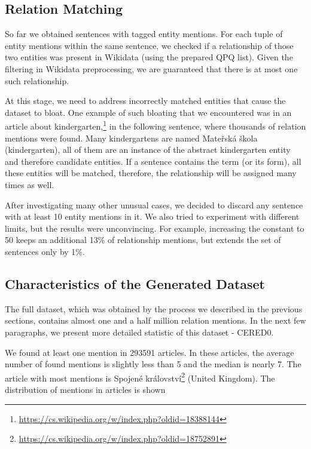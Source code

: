 \subsection{Relation Matching}
So far we obtained sentences with tagged entity mentions. For each tuple of entity mentions within the same sentence, we checked if a relationship of those two entities was present in Wikidata (using the prepared QPQ list). Given the filtering in Wikidata preprocessing, we are guaranteed that there is at most one such relationship. 

At this stage, we need to address incorrectly matched entities that cause the dataset to bloat. One example of such bloating that we encountered was in an article about kindergarten,\footnote{\url{https://cs.wikipedia.org/w/index.php?oldid=18388144}} in the following sentence, where thousands of relation mentions were found.   Many kindergartens are named Mateřská škola (kindergarten), all of them are an instance of the abstract kindergarten entity and therefore candidate entities. If a sentence contains the term  (or its form), all these entities will be matched, therefore, the relationship  will be assigned many times as well. 

After investigating many other unusual cases, we decided to discard any sentence with at least 10 entity mentions in it. We also tried to experiment with different limits, but the results were unconvincing. For example, increasing the constant to 50 keeps an additional 13\% of relationship mentions, but extends the set of sentences only by 1\%.


\subsection{Characteristics of the Generated Dataset}
The full dataset, which was obtained by the process we described in the previous sections, contains almost one and a half million relation mentions. In the next few paragraphs, we present more detailed statistic of this dataset - CERED0. 

We found at least one mention in \num{293591} articles. In these articles, the average number of found mentions is slightly less than 5 and the median is nearly 7. The article with most mentions is Spojené království\footnote{\url{https://cs.wikipedia.org/w/index.php?oldid=18752891}} (United Kingdom). The distribution of mentions in articles is shown 

